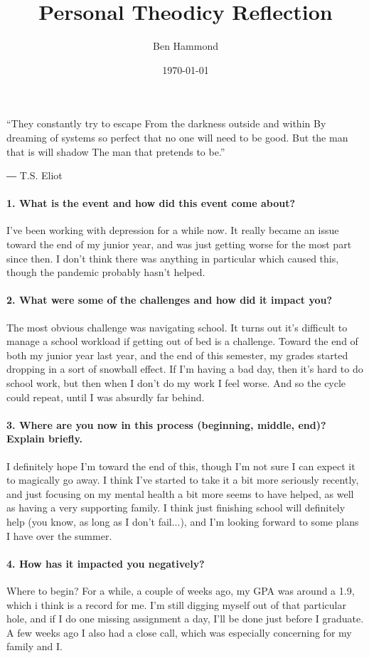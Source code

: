 \documentclass[12pt]{article}
\title{Personal Theodicy Reflection}
\author{Ben Hammond}
\date{\today}
\begin{document}
	\maketitle
	\newpage

	“They constantly try to escape
	From the darkness outside and within
	By dreaming of systems so perfect that no one will need to be good.
	But the man that is will shadow
	The man that pretends to be.”
	
	― T.S. Eliot

	\paragraph{1. What is the event and how did this event come about?}
	I've been working with depression for a while now. It really became an issue toward the end of my junior year, and was just getting worse for the most part since then. I don't think there was anything in particular which caused this, though the pandemic probably hasn't helped.

	\paragraph{2. What were some of the challenges and how did it impact you?}
	The most obvious challenge was navigating school. It turns out it's difficult to manage a school workload if getting out of bed is a challenge. Toward the end of both my junior year last year, and the end of this semester, my grades started dropping in a sort of snowball effect. If I'm having a bad day, then it's hard to do school work, but then when I don't do my work I feel worse. And so the cycle could repeat, until I was absurdly far behind.

	\paragraph{3. Where are you now in this process (beginning, middle, end)? Explain briefly.}
	I definitely hope I'm toward the end of this, though I'm not sure I can expect it to magically go away. I think I've started to take it a bit more seriously recently, and just focusing on my mental health a bit more seems to have helped, as well as having a very supporting family. I think just finishing school will definitely help (you know, as long as I don't fail...), and I'm looking forward to some plans I have over the summer.

	\paragraph{4. How has it impacted you negatively?}
	Where to begin? For a while, a couple of weeks ago, my GPA was around a 1.9, which i think is a record for me. I'm still digging myself out of that particular hole, and if I do one missing assignment a day, I'll be done just before I graduate. A few weeks ago I also had a close call, which was especially concerning for my family and I.
\end{document}
